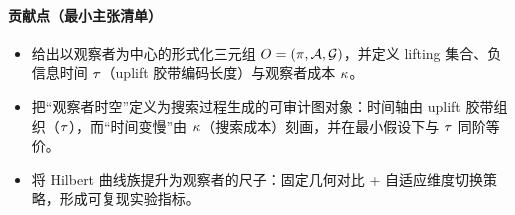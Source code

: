\begin{abstract}
本文以“本体是静态约束系统”作为第一性起点，提出一个以观察者为中心的时空构造：对观察者 \(O=(\proj,\mathcal A,\mathcal G)\)，其“时空”被定义为在本体约束 \(\Clo\) 上进行 lifting/一致性搜索时生成的搜索图。本文把“时间”定义为为保持本体可逆性而必须记录的 uplift/历史胶带的编码长度（负信息时间）\(\tautime\)，并在最小假设下给出 \(\kappaobs\)（搜索成本）与 \(\tautime\) 的同阶等价关系。本文进一步把 Hilbert 曲线族作为观察者的“尺子” \(\mathcal G\)：固定几何（1D/2D/3D）用于比较局部性选择对推断结构的影响；自适应维度切换用于刻画观察者在传播停滞时通过改变消元序/局部性结构来推进搜索的机制。最后以两条既有实例线索（\(m=6\) 的无损分块折叠核与一般 \(m\) 的 Zeckendorf 截断折叠）展示该框架的可审计可复现性。
\end{abstract}

\paragraph{贡献点（最小主张清单）}
\begin{itemize}
  \item 给出以观察者为中心的形式化三元组 \(O=(\proj,\mathcal A,\mathcal G)\)，并定义 lifting 集合、负信息时间 \(\tautime\)（uplift 胶带编码长度）与观察者成本 \(\kappaobs\)。
  \item 把“观察者时空”定义为搜索过程生成的可审计图对象：时间轴由 uplift 胶带组织（\(\tautime\)），而“时间变慢”由 \(\kappaobs\)（搜索成本）刻画，并在最小假设下与 \(\tautime\) 同阶等价。
  \item 将 Hilbert 曲线族提升为观察者的尺子：固定几何对比 + 自适应维度切换策略，形成可复现实验指标。
\end{itemize}


